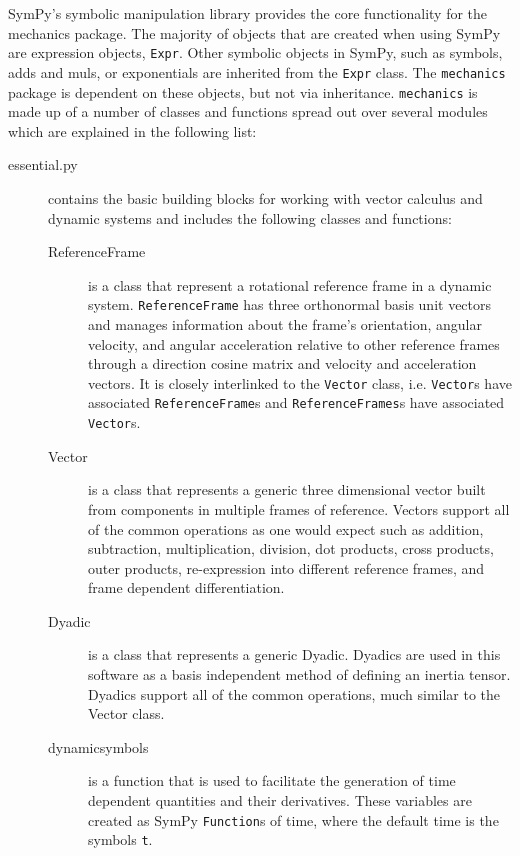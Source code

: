 \documentclass[twocolumn,10pt]{asme2e}
\begin{document}
SymPy's symbolic manipulation library provides the core functionality for the
mechanics package. The majority of objects that are created when using SymPy
are expression objects, \verb|Expr|. Other symbolic objects in SymPy, such as
symbols, adds and muls, or exponentials are inherited from the \verb|Expr|
class. The \verb|mechanics| package is dependent on these objects, but not via
inheritance. \verb|mechanics| is made up of a number of classes and functions
spread out over several modules which are explained in the following list:
%
\begin{description}
  \item[essential.py] contains the basic building blocks for working with
    vector calculus and dynamic systems and includes the following classes and
    functions:
    \begin{description}
      \item[ReferenceFrame] is a class that represent a rotational reference
        frame in a dynamic system. \verb|ReferenceFrame| has three orthonormal
        basis unit vectors and manages information about the frame's
        orientation, angular velocity, and angular acceleration relative to
        other reference frames through a direction cosine matrix and velocity
        and acceleration vectors. It is closely interlinked to the
        \verb|Vector| class, i.e. \verb|Vector|s have associated
        \verb|ReferenceFrame|s and \verb|ReferenceFrames|s have associated
        \verb|Vector|s.
      \item[Vector] is a class that represents a generic three dimensional
        vector built from components in multiple frames of reference. Vectors
        support all of the common operations as one would expect such as
        addition, subtraction, multiplication, division, dot products, cross
        products, outer products, re-expression into different reference
        frames, and frame dependent differentiation.
      \item[Dyadic] is a class that represents a generic Dyadic. Dyadics are
        used in this software as a basis independent method of defining an
        inertia tensor. Dyadics support all of the common operations, much
        similar to the Vector class.
      \item[dynamicsymbols] is a function that is used to facilitate the generation
        of time dependent quantities and their derivatives. These variables are
        created as SymPy \verb|Function|s of time, where the default time is
        the symbols \verb|t|.

\end{description}
\end{description}
\end{document}
